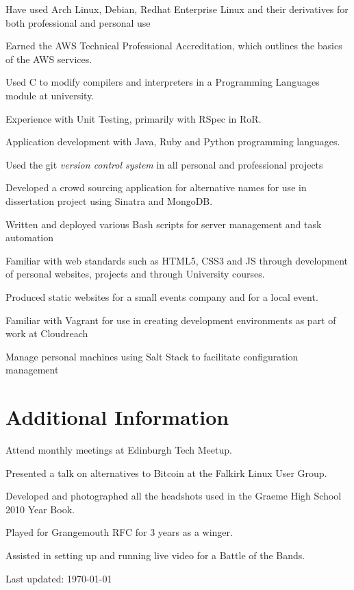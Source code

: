 \documentclass[11pt,a4paper]{article}
\renewenvironment{itemize}{
  \begin{list}{}{
    \setlength{\leftmargin}{1em}
    \setlength{\itemsep}{0.25em}
    \setlength{\parskip}{0pt}
    \setlength{\parsep}{0.25em}
    \renewcommand{\labelitemi}{$\bullet$}
  }
}{
  \end{list}
}
\begin{document}
\begin{itemize}
    \item Have used Arch Linux, Debian, Redhat Enterprise Linux and their derivatives for both professional and personal use
    \item Earned the AWS Technical Professional Accreditation, which outlines the basics of the AWS services.
    \item Used C to modify compilers and interpreters in a Programming Languages module at university.
    \item Experience with Unit Testing, primarily with RSpec in RoR.
    \item Application development with Java, Ruby and Python programming languages.
    \item Used the git \emph{version control system} in all personal and professional projects
    \item Developed a crowd sourcing application for alternative names for use in dissertation project using Sinatra and MongoDB.
    \item Written and deployed various Bash scripts for server management and task automation
    \item Familiar with web standards such as HTML5, CSS3 and JS through development of personal websites, projects and through University courses.
    \item Produced static websites for a small events company and for a local event.
    \item Familiar with Vagrant for use in creating development environments as part of work at Cloudreach
    \item Manage personal machines using Salt Stack to facilitate configuration management
\end{itemize}

\section*{Additional Information}

\begin{itemize}
    \item Attend monthly meetings at Edinburgh Tech Meetup.
    \item Presented a talk on alternatives to Bitcoin at the Falkirk
        Linux User Group.
    \item Developed and photographed all the headshots used in the Graeme High
        School 2010 Year Book.
    \item Played for Grangemouth RFC for 3 years as a winger.
    \item Assisted in setting up and running live video for a Battle of
        the Bands.
\end{itemize}


\medskip
\begin{center}
  \begin{small}
    Last updated: \today
  \end{small}
\end{center}
\end{document}
